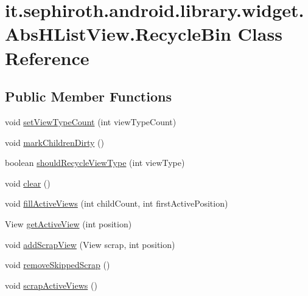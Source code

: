 \hypertarget{classit_1_1sephiroth_1_1android_1_1library_1_1widget_1_1_abs_h_list_view_1_1_recycle_bin}{}\section{it.\+sephiroth.\+android.\+library.\+widget.\+Abs\+H\+List\+View.\+Recycle\+Bin Class Reference}
\label{classit_1_1sephiroth_1_1android_1_1library_1_1widget_1_1_abs_h_list_view_1_1_recycle_bin}
\subsection*{Public Member Functions}
\begin{DoxyCompactItemize}
\item 
void \hyperlink{classit_1_1sephiroth_1_1android_1_1library_1_1widget_1_1_abs_h_list_view_1_1_recycle_bin_a6ffa81602739cfe394921022f2fcea76}{set\+View\+Type\+Count} (int view\+Type\+Count)
\item 
void \hyperlink{classit_1_1sephiroth_1_1android_1_1library_1_1widget_1_1_abs_h_list_view_1_1_recycle_bin_a5b44c87d750b6f271e41fc6d642626c8}{mark\+Children\+Dirty} ()
\item 
boolean \hyperlink{classit_1_1sephiroth_1_1android_1_1library_1_1widget_1_1_abs_h_list_view_1_1_recycle_bin_ae18756b75e4ad9f538eec25f17bf3e18}{should\+Recycle\+View\+Type} (int view\+Type)
\item 
void \hyperlink{classit_1_1sephiroth_1_1android_1_1library_1_1widget_1_1_abs_h_list_view_1_1_recycle_bin_a4d3d15886e4b6de483c1881fd2fbd971}{clear} ()
\item 
void \hyperlink{classit_1_1sephiroth_1_1android_1_1library_1_1widget_1_1_abs_h_list_view_1_1_recycle_bin_abdfb4b32bdca56f3182e45ab285f3fb6}{fill\+Active\+Views} (int child\+Count, int first\+Active\+Position)
\item 
View \hyperlink{classit_1_1sephiroth_1_1android_1_1library_1_1widget_1_1_abs_h_list_view_1_1_recycle_bin_acf9bc2e8a845ccb7956366eeccaa2434}{get\+Active\+View} (int position)
\item 
void \hyperlink{classit_1_1sephiroth_1_1android_1_1library_1_1widget_1_1_abs_h_list_view_1_1_recycle_bin_a2d534ed45386e876172e9c6982e3ed2d}{add\+Scrap\+View} (View scrap, int position)
\item 
void \hyperlink{classit_1_1sephiroth_1_1android_1_1library_1_1widget_1_1_abs_h_list_view_1_1_recycle_bin_ad65afc6ecd764bf10e8ec4fa4b601669}{remove\+Skipped\+Scrap} ()
\item 
void \hyperlink{classit_1_1sephiroth_1_1android_1_1library_1_1widget_1_1_abs_h_list_view_1_1_recycle_bin_a8a95b571d26ee2f21e60a18cacc1058b}{scrap\+Active\+Views} ()
\end{DoxyCompactItemize}



